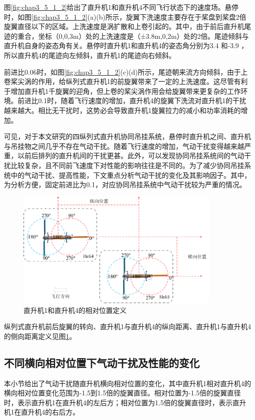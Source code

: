 图\ref{fig:chap3_5_1_2}给出了直升机1和直升机4不同飞行状态下的速度场。悬停时，如图\ref{fig:chap3_5_1_2}(a)(b)所示，旋翼下洗速度主要存在于桨盘到桨盘2倍旋翼直径以下的区域。上洗速度是涡扩散和上卷引起的。其中，由于前后直升机尾迹的重合，坐标（0,0,3m）处的上洗速度是（±3.8m,0,2m）处的2倍。尾迹倾斜与直升机自身的姿态角有关。悬停时直升机1和直升机4的姿态角分别为3.4 \degree 和-3.9 \degree，所以直升机4的尾迹向左倾斜，直升机1的尾迹向右倾斜。

前进比0.06时，如图\ref{fig:chap3_5_1_2}(c)(d)所示，尾迹朝来流方向倾斜，由于上卷桨尖涡的作用，给纵列式直升机1的前旋翼带来了一定的上洗速度。这尽管有利于增加直升机1千旋翼的迎角，但上卷的桨尖涡作用会给旋翼带来更复杂的工作环境。前进比0.1时，随着飞行速度的增加，直升机4的旋翼下洗流对直升机1的干扰越来越大。相比无干扰时，这势必会导致直升机1旋翼拉力的减小和功率消耗的增加。

可见，对于本文研究的四纵列式直升机协同吊挂系统，悬停时直升机之间、直升机与吊挂物之间几乎不存在气动干扰。随着飞行速度的增加，气动干扰变得越来越严重，以前后排列的直升机间的干扰更甚。此外，可以发现协同吊挂系统间的气动干扰比较复杂，且不同前飞速度下对性能的影响往往是不同的。为了减少协同吊挂系统中的气动干扰、提高性能，下文重点分析气动干扰的变化及其影响因子。其中，为分析方便，固定前进比为0.1，对应协同吊挂系统中气动干扰较为严重的情况。

\begin{figure}
  \centering
  \includegraphics[width=10cm]{fig/figure_chap3/chap_3_5_1_9.png}
  \caption{直升机1和直升机4的相对位置定义\label{fig:chap3_5_1_3}}
\end{figure}
 
纵列式直升机前后旋翼的转向、直升机1与直升机4的纵向距离、直升机1与直升机4的侧向距离定义见图\ref{fig:chap3_5_1_3}。

\subsection{不同横向相对位置下气动干扰及性能的变化}
本小节给出了气动干扰随直升机横向相对位置的变化，其中直升机1相对直升机4的横向相对位置变化范围为-1.5到1.5倍的旋翼直径。相对位置为-1.5倍的旋翼直径时，表示直升机1在直升机4的左后方；相对位置为1.5倍的旋翼直径时，表示直升机1在直升机4的右后方。


